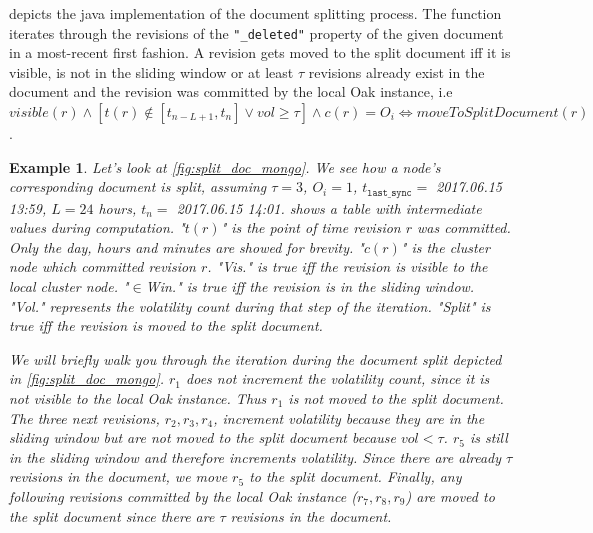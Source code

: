 \documentclass[abstracton,12pt]{scrreprt}
\newtheorem{example}{Example}
\begin{document}
 depicts the java implementation of the document splitting process.
The function iterates through the revisions of the \texttt{"\_deleted"} property of the given document in a most-recent first fashion.
A revision gets moved to the split document iff it is visible, is not in the sliding window or at least $\tau$ revisions already exist in the document and the revision was committed by the local Oak instance, 
i.e $visible(r) \land [t(r) \notin [t_{n-L+1},t_n] \lor vol \geq \tau] \land c(r) = O_i \iff moveToSplitDocument(r)$.

\begin{example}
    \label{ex:split_doc}
    Let's look at \cref{fig:split_doc_mongo}.
    We see how a node's corresponding document is split, assuming $\tau = 3$, $O_i = 1$, $t_{\texttt{last\_sync}} = $ {\footnotesize 2017.06.15 13:59}, $L = 24$ hours, $t_n = $ {\footnotesize 2017.06.15 14:01}.
     shows a table with intermediate values during computation.
    "$t(r)$" is the point of time revision $r$ was committed. Only the day, hours and minutes are showed for brevity.
    "$c(r)$" is the cluster node which committed revision $r$.
    "Vis." is true iff the revision is visible to the local cluster node.
    "$\in$Win." is true iff the revision is in the sliding window.
    "Vol." represents the volatility count during that step of the iteration. 
    "Split" is true iff the revision is moved to the split document.

    We will briefly walk you through the iteration during the document split depicted in \cref{fig:split_doc_mongo}.
    $r_1$ does not increment the volatility count, since it is not visible to the local Oak instance.
    Thus $r_1$ is not moved to the split document.
    The three next revisions, $r_2,r_3,r_4$, increment volatility because they are in the sliding window but are not moved to the split document because $vol < \tau$.
    $r_5$ is still in the sliding window and therefore increments volatility.
    Since there are already $\tau$ revisions in the document, we move $r_5$ to the split document.
    Finally, any following revisions committed by the local Oak instance ($r_7, r_8, r_9$) are moved to the split document since there are $\tau$ revisions in the document.
\end{example}
\end{document}
